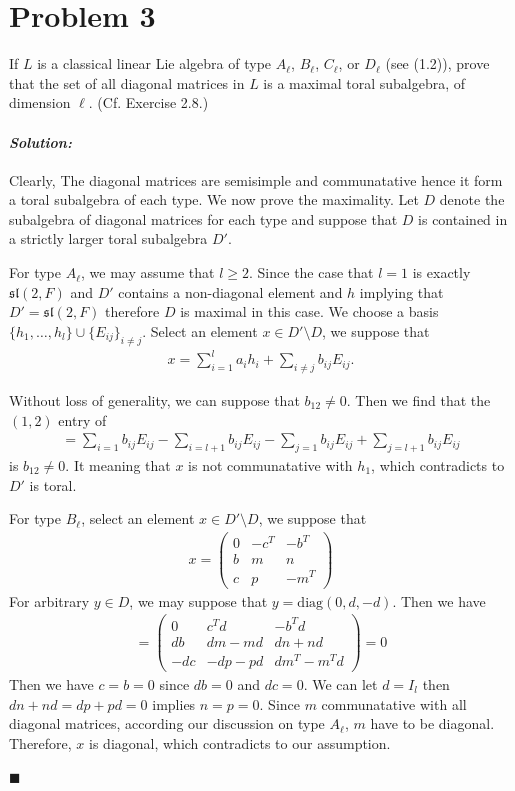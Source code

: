 \documentclass[12pt, a4paper]{article}
\newenvironment{solution}
  {\paragraph{\textit{Solution:}}\par\medskip}
  {\hfill$\blacksquare$\vspace{0.1cm}}
\begin{document}
\section*{Problem 3}
If $L$ is a classical linear Lie algebra of type $A_\ell$, $B_\ell$, $C_\ell$, or $D_\ell$ (see (1.2)), prove that the set of all diagonal matrices in $L$ is a maximal toral subalgebra, of dimension $\ell$. (Cf. Exercise 2.8.)
\begin{solution}
  Clearly, The diagonal matrices are semisimple and communatative hence it form a toral subalgebra of each type. We now prove the maximality.
  Let $D$ denote the subalgebra of diagonal matrices for each type and suppose that $D$ is contained in a strictly larger toral subalgebra $D'$.
  
  For type $A_\ell$, we may assume that $l\ge2$.
  Since the case that $l=1$ is exactly $\mathfrak{sl}(2,F)$ and 
  $D'$ contains a non-diagonal element and $h$ implying that $D'=\mathfrak{sl}(2,F)$ therefore $D$ is maximal in this case.
  We choose a basis $\{h_1,\dots,h_l\}\cup \{E_{ij}\}_{i\neq j}$. Select an element $x\in D'\setminus D$, we suppose that 
  \begin{align*}
    x= \sum_{i=1}^l a_i h_i+\sum_{i\neq j}b_{ij}E_{ij}.
  \end{align*}
   
  Without loss of generality, we can suppose that $b_{12}\neq 0$. Then we find that the $(1,2)$ entry of 
  \begin{align*}
    [h_1,x] = \sum_{i=1} b_{ij}E_{ij} - \sum_{i=l+1}b_{ij}E_{ij}- \sum_{j=1}b_{ij}E_{ij}+\sum_{j=l+1}b_{ij}E_{ij}
  \end{align*}
  is $b_{12}\neq 0$. It meaning that $x$ is not communatative with $h_1$, which contradicts to $D'$ is toral.

  For type $B_\ell$, select an element $x\in D'\setminus D$, we suppose that 
  \begin{align*}
    x = \begin{pmatrix} 0 & -c^T & -b^T \\ b & m & n \\ c & p & -m^T \end{pmatrix}
  \end{align*}
  For arbitrary $y\in D$, we may suppose that $y=\text{diag}(0,d,-d)$. Then we have 
  \begin{align*}
    [y,x] = \begin{pmatrix} 0 & c^Td & -b^Td \\ db & dm-md & dn+nd \\ -dc & -dp-pd & dm^T-m^Td \end{pmatrix} = 0
  \end{align*} 
  Then we have $c=b=0$ since $db=0$ and $dc=0$. We can let $d=I_l$ then $dn+nd=dp+pd=0$ implies $n=p=0$.
  Since $m$ communatative with all diagonal matrices, according our discussion on type $A_\ell$, $m$ have to be diagonal. Therefore, $x$ is diagonal, which contradicts to our assumption.


\end{solution}
\end{document}
